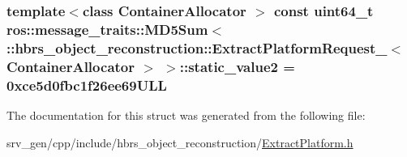 \hypertarget{structros_1_1message__traits_1_1_m_d5_sum_3_01_1_1hbrs__object__reconstruction_1_1_extract_platfd3ec68e33119d9e966e559be7b50877c_a7372f53ba7af6f1d65d178cf79b68554}{
\subsubsection[{static\-\_\-value2}]{\setlength{\rightskip}{0pt plus 5cm}template$<$class Container\-Allocator $>$ const uint64\-\_\-t ros\-::message\-\_\-traits\-::\-M\-D5\-Sum$<$ \-::{\bf hbrs\-\_\-object\-\_\-reconstruction\-::\-Extract\-Platform\-Request\-\_\-}$<$ \-Container\-Allocator $>$ $>$\-::{\bf static\-\_\-value2} = 0xce5d0fbc1f26ee69\-U\-L\-L}}\label{structros_1_1message__traits_1_1_m_d5_sum_3_01_1_1hbrs__object__reconstruction_1_1_extract_platfd3ec68e33119d9e966e559be7b50877c_a7372f53ba7af6f1d65d178cf79b68554}


\-The documentation for this struct was generated from the following file\-:\begin{DoxyCompactItemize}
\item 
srv\-\_\-gen/cpp/include/hbrs\-\_\-object\-\_\-reconstruction/\hyperlink{_extract_platform_8h}{\-Extract\-Platform.\-h}\end{DoxyCompactItemize}
